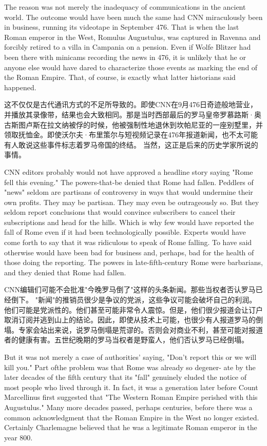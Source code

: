 \begin{Parallel}{97mm}{72mm}
  \ParallelLText
  {The reason was not merely the inadequacy of communications in the ancient world. The outcome would have been much the same had CNN miraculously been in business, running its videotape in September 476. That is when the last Roman emperor in the West, Romulus Augustulus, was captured in Ravenna and forcibly retired to a villa in Campania on a pension. Even if Wolfe Blitzer had been there with minicams recording the news in 476, it is unlikely that he or anyone else would have dared to characterize those events as marking the end of the Roman Empire. That, of course, is exactly what latter historians said happened.}
  
  \ParallelRText
  {这不仅仅是古代通讯方式的不足所导致的。即使CNN在9月476日奇迹般地营业，并播放其录像带，结果也会大致相同。那是当时西部最后的罗马皇帝罗慕路斯·奥古斯图卢斯在拉文纳被俘的时候，他被强制性地退休到坎帕尼亚的一座别墅里，并领取抚恤金。即使沃尔夫·布里策尔与短视频记录在476年报道新闻，也不太可能有人敢说这些事件标志着罗马帝国的终结。 当然，这正是后来的历史学家所说的事情。}
  \ParallelPar

  \ParallelLText
  {CNN editors probably would not have approved a headline story saying "Rome fell this evening." The powers-that-be denied that Rome had fallen. Peddlers of "news" seldom are partisans of controversy in ways that would undermine their own profits. They may be partisan. They may even be outrageously so. But they seldom report conclusions that would convince subscribers to cancel their subscriptions and head for the hills. Which is why few would have reported the fall of Rome even if it had been technologically possible. Experts would have come forth to say that it was ridiculous to speak of Rome falling. To have said otherwise would have been bad for business and, perhaps, bad for the health of those doing the reporting. The powers in late-fifth-century Rome were barbarians, and they denied that Rome had fallen.}
  
  \ParallelRText
  {CNN编辑们可能不会批准"今晚罗马倒了"这样的头条新闻。那些当权者否认罗马已经倒下。 "新闻"的推销员很少是争议的党派，这些争议可能会破坏自己的利润。他们可能是党派性的。他们甚至可能非常令人震惊。但是，他们很少报道会让订户取消订阅并逃到山上的结论。因此，即使从技术上可能，也很少有人报道罗马的倒塌。专家会站出来说，说罗马倒塌是荒谬的。否则会对商业不利，甚至可能对报道者的健康有害。五世纪晚期的罗马当权者是野蛮人，他们否认罗马已经倒塌。}
  \ParallelPar




  \ParallelLText
  {But it was not merely a case of authorities' saying, "Don't report this or we will kill you." Part ofthe problem was that Rome was already so degener- ate by the later decades of the fifth century that its "fall" genuinely eluded the notice of most people who lived through it. In fact, it was a generation later before Count Marcellinus first suggested that "The Western Roman Empire perished with this Augustulus." Many more decades passed, perhaps centuries, before there was a common acknowledgment that the Roman Empire in the West no longer existed. Certainly Charlemagne believed that he was a legitimate Roman emperor in the year 800.}
  

\end{Parallel}
